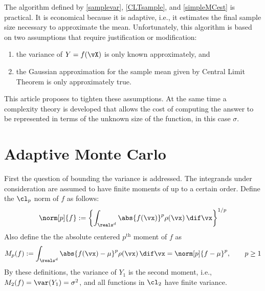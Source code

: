 \documentclass[12pt]{amsart}
\begin{document}
The algorithm defined by \eqref{samplevar}, \eqref{CLTsample}, and \eqref{simpleMCest} is practical.  It is economical because it is adaptive, i.e., it estimates the final sample size necessary to approximate the mean.  Unfortunately, this algorithm is based on two assumptions that require justification or modification:
\begin{enumerate}
\renewcommand{\labelenumi}{\roman{enumi})}
\item the variance of $Y=f(\vX)$ is only known approximately, and
\item the Gaussian approximation for the sample mean given by Central Limit Theorem is only approximately true.
\end{enumerate}
This article proposes to tighten these assumptions.  At the same time a complexity theory is developed that allows the cost of computing the answer to be represented in terms of the unknown size of the function, in this case $\sigma$.


\section{Adaptive Monte Carlo}

First the question of bounding the variance is addressed.  The integrands under consideration are assumed to have finite moments of up to a certain order.  Define the $\cl_{p}$ norm of $f$ as follows:
\[
\norm[p]{f} :=\left\{\int_{\reals^d} \abs{f(\vx)}^p \rho(\vx) \, \dif \vx\right\}^{1/p}
\]
Also define the the absolute centered $p^{\text{th}}$ moment of $f$ as
\begin{equation} \label{momentdef}
M_p(f) := \int_{\reals^d} \abs{f(\vx)-\mu}^p \rho(\vx) \, \dif \vx = \norm[p]{f - \mu}^p, \qquad p \ge 1
\end{equation}
By these definitions, the variance of $Y_1$ is the second moment, i.e., $M_2(f) = \var(Y_1)=\sigma^2$, and all functions in $\cl_2$ have finite variance.
\end{document}
